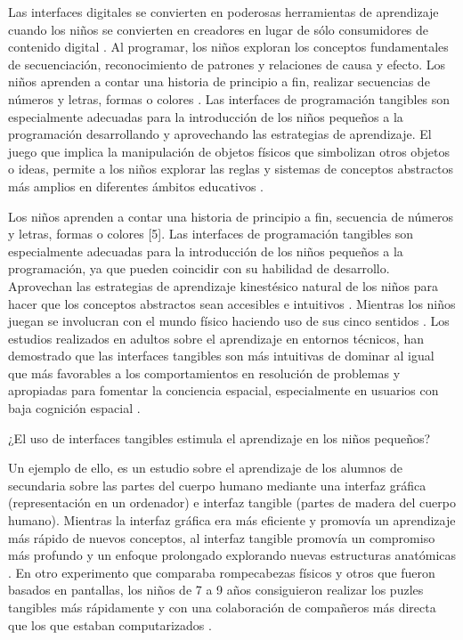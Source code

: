 Las interfaces digitales se convierten en poderosas herramientas de aprendizaje cuando los niños se convierten en creadores en lugar de sólo consumidores de contenido digital \cite{Resnick}. Al programar, los niños exploran los conceptos fundamentales de secuenciación, reconocimiento de patrones y relaciones de causa y efecto. Los niños aprenden a contar una historia de principio a fin, realizar secuencias de números y letras, formas o colores \cite{Kazakoff}.
Las interfaces de programación tangibles son especialmente adecuadas para la introducción de los niños pequeños a la programación desarrollando y aprovechando las estrategias de aprendizaje. El juego que implica la manipulación de objetos físicos que simbolizan otros objetos o ideas, permite a los niños explorar las reglas y sistemas de conceptos abstractos más amplios en diferentes ámbitos educativos \cite{Piaget}.

Los niños aprenden a contar una historia de principio a fin, secuencia de números y letras, formas o colores [5]. Las interfaces de programación tangibles son especialmente adecuadas para la introducción de los niños pequeños a la programación, ya que pueden coincidir con su habilidad de desarrollo. Aprovechan las estrategias de aprendizaje kinestésico natural de los niños para hacer que los conceptos abstractos sean accesibles e intuitivos \cite{Xu}. Mientras los niños juegan se involucran con el mundo físico haciendo uso de sus cinco sentidos \cite{Vygotsky}.
Los estudios realizados en adultos sobre el aprendizaje en entornos técnicos, han demostrado que las interfaces tangibles son más intuitivas de dominar al igual que más favorables a los comportamientos en resolución de problemas y apropiadas para fomentar la conciencia espacial, especialmente en usuarios con baja cognición espacial \cite{Quarles} \cite{Kim}.

¿El uso de interfaces tangibles estimula el aprendizaje en los niños pequeños?

Un ejemplo de ello, es un estudio sobre el aprendizaje de los alumnos de secundaria sobre las partes del cuerpo humano mediante una interfaz gráfica (representación en un ordenador) e interfaz tangible (partes de madera del cuerpo humano). Mientras la interfaz gráfica era más eficiente y promovía un aprendizaje más rápido de nuevos conceptos, al interfaz tangible promovía un compromiso más profundo y un enfoque prolongado explorando nuevas estructuras anatómicas \cite{Ploderer}.
En otro experimento que comparaba rompecabezas físicos y otros que fueron basados en pantallas, los niños de 7 a 9 años consiguieron realizar los puzles tangibles más rápidamente y con una colaboración de compañeros más directa que los que estaban computarizados \cite{Xie}.

